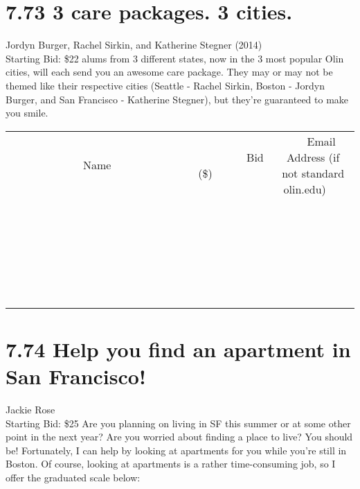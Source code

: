 \documentclass[11pt]{article}
\begin{document}
\section*{7.73 3 care packages. 3 cities.}
Jordyn Burger, Rachel Sirkin, and Katherine Stegner (2014)
\\
Starting Bid: \$22
 alums from 3 different states, now in the 3 most popular Olin cities, will each send you an awesome care package. They may or may not be themed like their respective cities (Seattle - Rachel Sirkin, Boston - Jordyn Burger, and San Francisco - Katherine Stegner), but they're guaranteed to make you smile.
\\[6ex]
\begin{tabular}{c c c}
~~~~~~~~~~~~~Name~~~~~~~~~~~~~ & ~~~~~~~~~Bid (\$)~~~~~~~~~  & ~~~Email Address (if not standard olin.edu)~~~\\
 & & \\
\hline
 & & \\
\hline
 & & \\
\hline
 & & \\
\hline
 & & \\
\hline
 & & \\
\hline
 & & \\
\hline
 & & \\
\hline
 & & \\
\hline
 & & \\
\hline
 & & \\
\hline
 & & \\
\hline
 & & \\
\hline
 & & \\
\hline
 & & \\
\hline
 & & \\
\hline
 & & \\
\hline
 & & \\
\hline
 & & \\
\hline
 & & \\
\hline
 & & \\
\hline
 & & \\
\hline
 & & \\
\hline
 & & \\
\hline
 & & \\
\hline
 & & \\
\hline
\end{tabular}
\newpage
\section*{7.74 Help you find an apartment in San Francisco!}
Jackie Rose
\\
Starting Bid: \$25
\newline
Are you planning on living in SF this summer or at some other point in the next year? Are you worried about finding a place to live? You should be! Fortunately, I can help by looking at apartments for you while you're still in Boston. Of course, looking at apartments is a rather time-consuming job, so I offer the graduated scale below:
\end{document}
